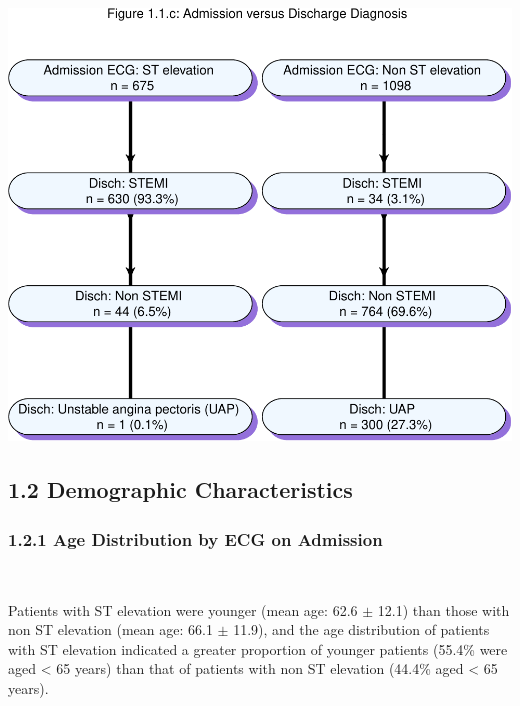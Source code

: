 \documentclass[
]{article}
\begin{document}
~

\includegraphics{ACSIS_2024_v1_pdf_files/figure-latex/unnamed-chunk-7-1.pdf}

\pagebreak

\subsection{1.2 Demographic
Characteristics}\label{demographic-characteristics}

\subsubsection{1.2.1 Age Distribution by ECG on
Admission}\label{age-distribution-by-ecg-on-admission}

~

Patients with ST elevation were younger (mean age: 62.6 \(\pm\) 12.1)
than those with non ST elevation (mean age: 66.1 \(\pm\) 11.9), and the
age distribution of patients with ST elevation indicated a greater
proportion of younger patients (55.4\% were aged \textless{} 65 years)
than that of patients with non ST elevation (44.4\% aged \textless{} 65
years).

~
\end{document}
